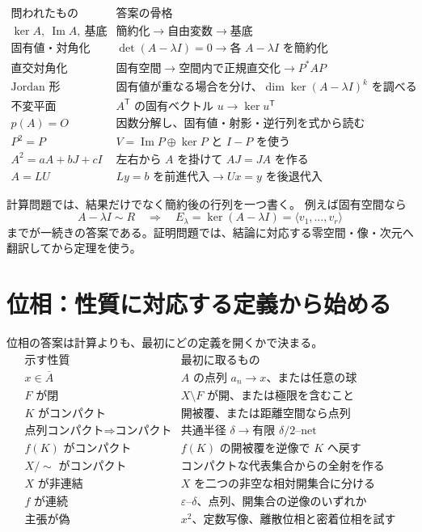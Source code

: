 \[
\begin{array}{c|l}
\text{問われたもの}&\text{答案の骨格}\\ \hline
\ker A,\ \operatorname{Im}A,\ \text{基底}&\text{簡約化}\to\text{自由変数}\to\text{基底}\\
\text{固有値・対角化}&\det(A-\lambda I)=0\to\text{各 }A-\lambda I\text{ を簡約化}\\
\text{直交対角化}&\text{固有空間}\to\text{空間内で正規直交化}\to P^*AP\\
\text{Jordan 形}&\text{固有値が重なる場合を分け、}\dim\ker(A-\lambda I)^k\text{ を調べる}\\
\text{不変平面}&A^{\mathsf T}\text{ の固有ベクトル }u\to\ker u^{\mathsf T}\\
p(A)=O&\text{因数分解し、固有値・射影・逆行列を式から読む}\\
P^2=P&V=\operatorname{Im}P\oplus\ker P\text{ と }I-P\text{ を使う}\\
A^2=aA+bJ+cI&\text{左右から }A\text{ を掛けて }AJ=JA\text{ を作る}\\
A=LU&Ly=b\text{ を前進代入}\to Ux=y\text{ を後退代入}
\end{array}
\]

計算問題では、結果だけでなく簡約後の行列を一つ書く。
例えば固有空間なら
\[
A-\lambda I\sim R
\quad\Longrightarrow\quad
E_\lambda=\ker(A-\lambda I)=\langle v_1,\ldots,v_r\rangle
\]
までが一続きの答案である。証明問題では、結論に対応する零空間・像・次元へ翻訳してから定理を使う。

\section{位相：性質に対応する定義から始める}

位相の答案は計算よりも、最初にどの定義を開くかで決まる。
\[
\begin{array}{c|l}
\text{示す性質}&\text{最初に取るもの}\\ \hline
x\in\overline A&A\text{ の点列 }a_n\to x\text{、または任意の球}\\
F\text{ が閉}&X\setminus F\text{ が開、または極限を含むこと}\\
K\text{ がコンパクト}&\text{開被覆、または距離空間なら点列}\\
\text{点列コンパクト}\Rightarrow\text{コンパクト}&\text{共通半径 }\delta\to\text{有限 }\delta/2\text{--net}\\
f(K)\text{ がコンパクト}&f(K)\text{ の開被覆を逆像で }K\text{ へ戻す}\\
X/{\sim}\text{ がコンパクト}&\text{コンパクトな代表集合からの全射を作る}\\
X\text{ が非連結}&X\text{ を二つの非空な相対開集合に分ける}\\
f\text{ が連続}&\varepsilon\text{--}\delta、\text{点列、開集合の逆像のいずれか}\\
\text{主張が偽}&x^2、\text{定数写像、離散位相と密着位相を試す}
\end{array}
\]

